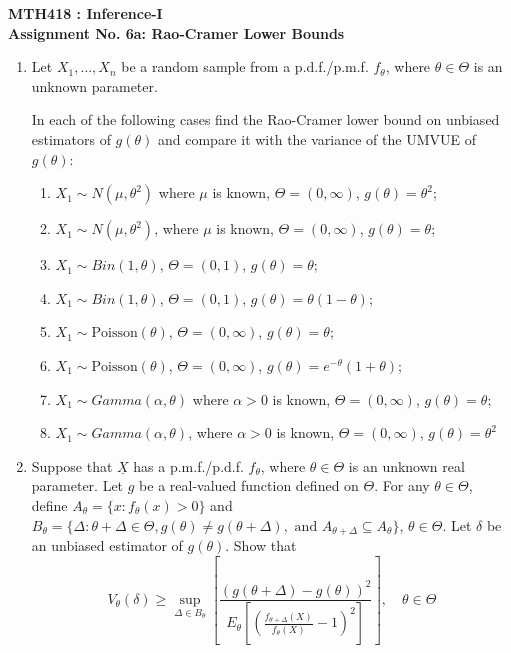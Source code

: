 \documentclass[12pt]{article}
\begin{document}
\begin{center}
    \textbf{\large MTH418 : Inference-I} \\
    \textbf{Assignment No. 6a: Rao-Cramer Lower Bounds}
\end{center}

\begin{enumerate}
    \item Let $X_{1}, \dots, X_{n}$ be a random sample from a p.d.f./p.m.f. $f_{\theta}$, where $\theta \in \Theta$ is an unknown parameter.
    
    In each of the following cases find the Rao-Cramer lower bound on unbiased estimators of $g(\theta)$ and compare it with the variance of the UMVUE of $g(\theta)$:
    \begin{enumerate}
        \item[(i)] $X_{1} \sim N(\mu, \theta^{2})$ where $\mu$ is known, $\Theta = (0, \infty)$, $g(\theta) = \theta^{2}$;
        \item[(ii)] $X_{1} \sim N(\mu, \theta^{2})$, where $\mu$ is known, $\Theta = (0, \infty)$, $g(\theta) = \theta$;
        \item[(iii)] $X_{1} \sim Bin(1, \theta)$, $\Theta = (0, 1)$, $g(\theta) = \theta$;
        \item[(iv)] $X_{1} \sim Bin(1, \theta)$, $\Theta = (0, 1)$, $g(\theta) = \theta(1 - \theta)$;
        \item[(v)] $X_{1} \sim \text{Poisson}(\theta)$, $\Theta = (0, \infty)$, $g(\theta) = \theta$;
        \item[(vi)] $X_{1} \sim \text{Poisson}(\theta)$, $\Theta = (0, \infty)$, $g(\theta) = e^{-\theta}(1 + \theta)$;
        \item[(vii)] $X_{1} \sim Gamma(\alpha, \theta)$ where $\alpha > 0$ is known, $\Theta = (0, \infty)$, $g(\theta) = \theta$;
        \item[(viii)] $X_{1} \sim Gamma(\alpha, \theta)$, where $\alpha > 0$ is known, $\Theta = (0, \infty)$, $g(\theta) = \theta^{2}$
    \end{enumerate}

    \item Suppose that $\underline{X}$ has a p.m.f./p.d.f. $f_{\theta}$, where $\theta \in \Theta$ is an unknown real parameter. Let $g$ be a real-valued function defined on $\Theta$. For any $\theta \in \Theta$, define $A_{\theta} = \{x : f_{\theta}(x) > 0\}$ and $B_{\theta} = \{\Delta : \theta + \Delta \in \Theta, g(\theta) \neq g(\theta + \Delta), \text{ and } A_{\theta + \Delta} \subseteq A_{\theta}\}$, $\theta \in \Theta$. Let $\delta$ be an unbiased estimator of $g(\theta)$. Show that
    \[
    V_{\theta}(\delta) \ge \sup_{\Delta \in B_{\theta}} \left[ \frac{(g(\theta + \Delta) - g(\theta))^{2}}{E_{\theta} \left[ \left( \frac{f_{\theta + \Delta}(X)}{f_{\theta}(X)} - 1 \right)^{2} \right]} \right], \quad \theta \in \Theta
    \]


\end{enumerate}
\end{document}

